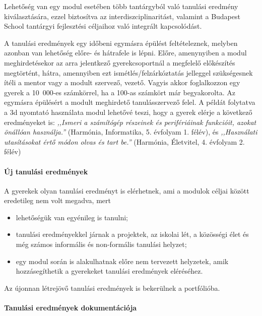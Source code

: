 Lehetőség van egy modul esetében több tantárgyból való
tanulási\linebreak
eredmény kiválasztására, ezzel biztosítva az interdiszciplinaritást, valamint a Budapest School tantárgyi fejlesztési céljaihoz való integrált kapcsolódást.

A tanulási eredmények egy időbeni egymásra épülést feltételeznek,
melyben azonban van lehetőség előre- és hátrafele is lépni. Előre,
ameny\-nyi\-ben a modul meghirdetésekor az arra jelentkező
gyerekcsoportnál a megfelelő előkészítés megtörtént, hátra, amennyiben
ezt ismétlés\slash fel\-zár\-kóz\-ta\-tás jelleggel szükségesnek ítéli a mentor vagy a modult szervező, vezető. Vagyis akkor foglalkozzon egy gyerek a 10~000-es számkörrel, ha a 100-as számkört már begyakorolta. Az egymásra épülésért a modult meghirdető tanulásszervező felel. A példát folytatva a 3d nyomtató használata modul lehetővé teszi, hogy a gyerek elérje a következő eredményeket is: \emph{,,Ismeri a számítógép
      részeinek és perifériáinak funkcióit, azokat önállóan használja.''}
(Harmónia, Informatika, 5. évfolyam 1. félév), és  \emph{,,Használati utasításokat
      értő módon olvas és tart be.''} (Harmónia, Életvitel, 4. évfolyam 2. félév)
\newpage

\paragraph{Új tanulási eredmények}

A gyerekek olyan tanulási eredményt is elérhetnek, ami a modulok céljai között eredetileg nem volt megadva, mert

\begin{itemize}
      \item lehetőségük van egyénileg is tanulni;

      \item tanulási eredményekkel járnak a projektek, az iskolai lét, a közösségi élet és még számos informális és non-formális tanulási helyzet;

      \item egy modul során is alakulhatnak előre nem tervezett
        helyzetek,\linebreak
        amik hozzásegíthetik a gyerekeket tanulási eredmények eléréséhez.
\end{itemize}

Az újonnan létrejövő tanulási eredmények is bekerülnek a portfólióba.

\paragraph{Tanulási eredmények dokumentációja}

